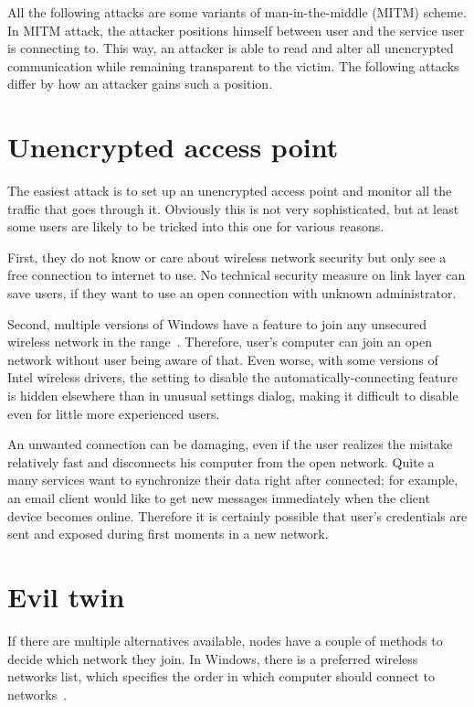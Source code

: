 \documentclass[12pt,a4paper,oneside,pdftex]{report}
\begin{document}
All the following attacks are some variants of man-in-the-middle (MITM) scheme. In MITM attack, the attacker positions himself between user and the service user is connecting to. This way, an attacker is able to read and alter all unencrypted communication while remaining transparent to the victim. The following attacks differ by how an attacker gains such a position.

\section{Unencrypted access point}
\label{sec:attack_unencrypted}

The easiest attack is to set up an unencrypted access point and monitor all the traffic that goes through it. Obviously this is not very sophisticated, but at least some users are likely to be tricked into this one for various reasons.

First, they do not know or care about wireless network security but only see a free connection to internet to use. No technical security measure on link layer can save users, if they want to use an open connection with unknown administrator.

Second, multiple versions of Windows have a feature to join any unsecured wireless network in the range~\cite{dai2005attacking,windows_wifi_answers}. Therefore, user's computer can join an open network without user being aware of that. Even worse, with some versions of Intel wireless drivers, the setting to disable the automatically-connecting feature is hidden elsewhere than in unusual settings dialog, making it difficult to disable even for little more experienced users.~\cite{windows_wifi_answers}

An unwanted connection can be damaging, even if the user realizes the mistake relatively fast and disconnects his computer from the open network. Quite a many services want to synchronize their data right after connected; for example, an email client would like to get new messages immediately when the client device becomes online. Therefore it is certainly possible that user's credentials are sent and exposed during first moments in a new network.

\section{Evil twin}
\label{sec:evil_twin}

If there are multiple alternatives available, nodes have a couple of methods to decide which network they join. In Windows, there is a preferred wireless networks list, which specifies the order in which computer should connect to networks~\cite{windows_wifi_preferred}. 
\end{document}
